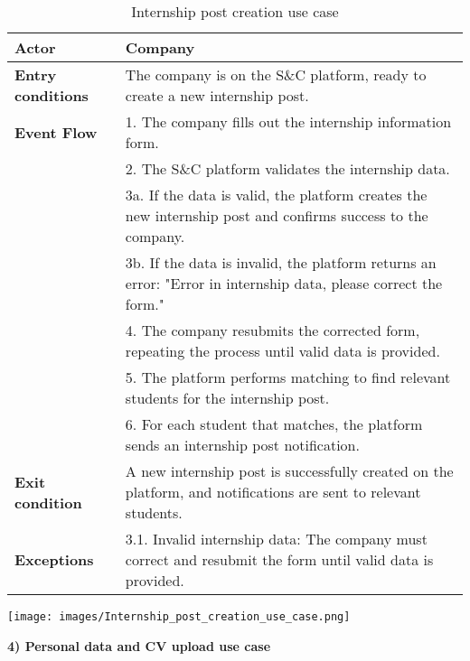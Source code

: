 \begin{table}[h!]
    \centering
    \begin{tabular}{lp{10cm}}
        \textbf{Actor} & Company \\ \hline
        \textbf{Entry conditions} & The company is on the S\&C platform, ready to create a new internship post. \\ \hline
        \textbf{Event Flow} & 
        1. The company fills out the internship information form. \\
        & 2. The S\&C platform validates the internship data. \\
        & 3a. If the data is valid, the platform creates the new internship post and confirms success to the company. \\
        & 3b. If the data is invalid, the platform returns an error: "Error in internship data, please correct the form." \\
        & 4. The company resubmits the corrected form, repeating the process until valid data is provided. \\
        & 5. The platform performs matching to find relevant students for the internship post. \\
        & 6. For each student that matches, the platform sends an internship post notification. \\
        \hline
        \textbf{Exit condition} & A new internship post is successfully created on the platform, and notifications are sent to relevant students. \\ \hline
        \textbf{Exceptions} & 
        3.1. Invalid internship data: The company must correct and resubmit the form until valid data is provided. \\
    \end{tabular}
    \caption{Internship post creation use case}
    \label{tab:internship_post_creation}
\end{table}



\begin{center}
    \texttt{[image: images/Internship\_post\_creation\_use\_case.png]}
\end{center}

\newpage
\textbf{4) Personal data and CV upload use case}\\

